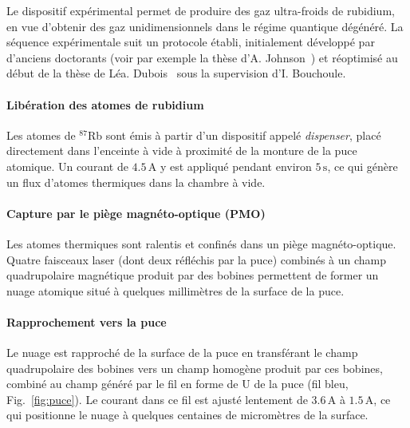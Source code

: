 Le dispositif expérimental permet de produire des gaz ultra-froids de rubidium, en vue d’obtenir des gaz unidimensionnels dans le régime quantique dégénéré. La séquence expérimentale suit un protocole établi, initialement développé par d’anciens doctorants (voir par exemple la thèse d’A. Johnson~\cite{Johnson2016}) et réoptimisé au début de la thèse de Léa. Dubois~\cite{L.Dubois2024} sous la supervision d’I. Bouchoule.


\paragraph{Libération des atomes de rubidium}
Les atomes de $^{87}$Rb sont émis à partir d’un dispositif appelé \emph{dispenser}, placé directement dans l’enceinte à vide à proximité de la monture de la puce atomique. Un courant de \( 4.5\,\mathrm{A} \) y est appliqué pendant environ \( 5\,\mathrm{s} \), ce qui génère un flux d’atomes thermiques dans la chambre à vide.

\paragraph{Capture par le piège magnéto-optique (\gls{PMO})}
Les atomes thermiques sont ralentis et confinés dans un piège magnéto-optique. Quatre faisceaux laser (dont deux réfléchis par la puce) combinés à un champ quadrupolaire magnétique produit par des bobines permettent de former un nuage atomique situé à quelques millimètres de la surface de la puce.


\paragraph{Rapprochement vers la puce}
Le nuage est rapproché de la surface de la puce en transférant le champ quadrupolaire des bobines vers un champ homogène produit par ces bobines, combiné au champ généré par le fil en forme de U de la puce (fil bleu, Fig.~\ref{fig:puce}). Le courant dans ce fil est ajusté lentement de \(3.6\,\mathrm{A}\) à \(1.5\,\mathrm{A}\), ce qui positionne le nuage à quelques centaines de micromètres de la surface.

